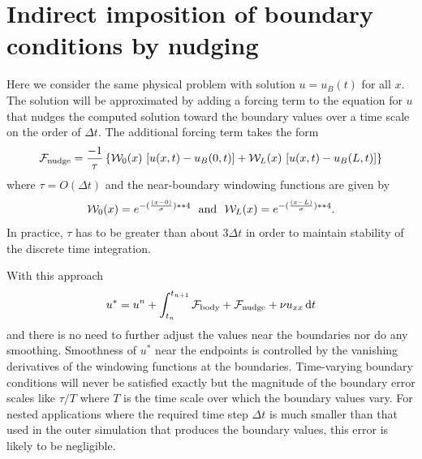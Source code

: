 \documentclass{jfm}
\begin{document}
\section{Indirect imposition of boundary conditions by nudging}
Here we consider the same physical problem with solution $u=u_B(t)$ for all $x$. The solution will be approximated by adding a forcing term to the equation for $u$ that nudges the computed solution toward the
boundary values over a time scale on the order of $\Delta t$. 
The additional forcing term takes the form
\begin{equation}
{\mathcal F}_{\rm nudge} = \frac{-1}{\tau}  \left\{ {\mathcal W}_0(x) \, \left[ u(x,t) - u_B(0,t) \right] + {\mathcal W}_L(x) \,  \left[ u(x,t) - u_B(L,t) \right]    \right\}
\end{equation}
where $\tau=O(\Delta t)$
and the near-boundary windowing functions are given by
\begin{equation}
{\mathcal W}_0(x) = e^{-(\frac{(x-0)}{\sigma})**4} ~~{\rm and}~~ {\mathcal W}_L(x) = e^{-(\frac{(x-L)}{\sigma})**4}.
\end{equation}
In practice, $\tau$  has to be greater than about $3\Delta t$ in order to maintain stability of the discrete time integration.

With this approach
\begin{equation}
 u^* = u^n + \int_{t_n}^{t_{n+1}}  {\mathcal F}_{\rm body} + {\mathcal F}_{\rm nudge} + \nu u_{xx} \, {\rm d}t
\end{equation}
and there is no need to further adjust the values near the boundaries nor do any smoothing. Smoothness of $u^*$ near the endpoints is controlled by the vanishing derivatives of the windowing functions at the boundaries.
Time-varying boundary conditions will never be satisfied exactly but the magnitude of the boundary error scales like $\tau/T$ where $T$ is the time scale over which the boundary values vary. For nested applications where
the required time step $\Delta t$ is much smaller than that used in the outer simulation that produces the boundary values, this error is likely to be negligible.
\end{document}
